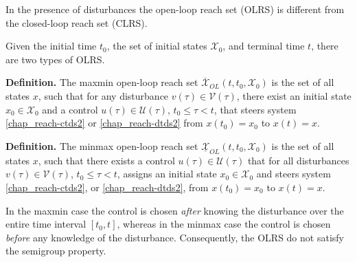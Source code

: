 \documentclass[letterpaper,10pt,english]{sphinxmanual}
\begin{document}
In the presence of disturbances the open-loop reach set (OLRS) is
different from the closed-loop reach set (CLRS).

Given the initial time $t_0$, the set of initial states
${\mathcal X}_0$, and terminal time $t$, there are two types
of OLRS.

\textbf{Definition.} The maxmin open-loop reach set
$\overline{{\mathcal X}}_{OL}(t, t_0, {\mathcal X}_0)$ is the set
of all states $x$, such that for any disturbance
$v(\tau)\in{\mathcal V}(\tau)$, there exist an initial state
$x_0\in{\mathcal X}_0$ and a control
$u(\tau)\in{\mathcal U}(\tau)$, $t_0\leqslant\tau<t$, that
steers system \eqref{chap_reach-ctds2} or \eqref{chap_reach-dtds2} from $x(t_0)=x_0$ to
$x(t)=x$.

\textbf{Definition.} The minmax open-loop reach set
$\underline{{\mathcal X}}_{OL}(t, t_0, {\mathcal X}_0)$ is the set
of all states $x$, such that there exists a control
$u(\tau)\in{\mathcal U}(\tau)$ that for all disturbances
$v(\tau)\in{\mathcal V}(\tau)$, $t_0\leqslant\tau<t$,
assigns an initial state $x_0\in{\mathcal X}_0$ and steers system
\eqref{chap_reach-ctds2}, or \eqref{chap_reach-dtds2}, from $x(t_0)=x_0$ to $x(t)=x$.

In the maxmin case the control is chosen
\emph{after} knowing the disturbance over the entire time interval
$[t_0, t]$, whereas in the minmax case the control is chosen
\emph{before} any knowledge of the disturbance. Consequently, the OLRS do not
satisfy the semigroup property.
\end{document}
